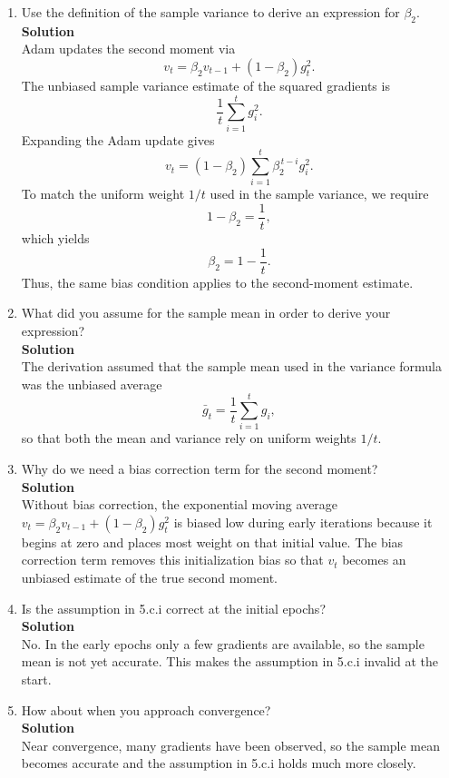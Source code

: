 \documentclass[11pt]{article}
\begin{document}
	\begin{enumerate}[label=5.c.\roman*., leftmargin=1.4cm, itemsep=0.4em]
		\item Use the definition of the sample variance to derive an expression for \(\beta_{2}\).\\
		\noindent\textbf{Solution}\\
		Adam updates the second moment via
		\[
		v_t = \beta_2 v_{t-1} + (1-\beta_2) g_t^2.
		\]
		The unbiased sample variance estimate of the squared gradients is
		\[
		\frac{1}{t}\sum_{i=1}^t g_i^2.
		\]
		Expanding the Adam update gives
		\[
		v_t = (1-\beta_2)\sum_{i=1}^t \beta_2^{\,t-i} g_i^2.
		\]
		To match the uniform weight \(1/t\) used in the sample variance, we require
		\[
		1-\beta_2 = \frac{1}{t},
		\]
		which yields
		\[
		\beta_2 = 1 - \frac{1}{t}.
		\]
		Thus, the same bias condition applies to the second-moment estimate.
		
		\item What did you assume for the sample mean in order to derive your expression?\\
		\noindent\textbf{Solution}\\
		The derivation assumed that the sample mean used in the variance formula was the
		unbiased average
		\[
		\bar{g}_t = \frac{1}{t}\sum_{i=1}^t g_i,
		\]
		so that both the mean and variance rely on uniform weights \(1/t\).
		
		\item Why do we need a bias correction term for the second moment?\\
		\noindent\textbf{Solution}\\
		Without bias correction, the exponential moving average
		\(
		v_t = \beta_2 v_{t-1} + (1-\beta_2) g_t^2
		\)
		is biased low during early iterations because it begins at zero and places most
		weight on that initial value. The bias correction term removes this initialization
		bias so that \(v_t\) becomes an unbiased estimate of the true second moment.
		
		\item Is the assumption in 5.c.i correct at the initial epochs?\\
		\noindent\textbf{Solution}\\
		No. In the early epochs only a few gradients are available, so the sample mean is
		not yet accurate. This makes the assumption in 5.c.i invalid at the start.
		
		\item How about when you approach convergence?\\
		\noindent\textbf{Solution}\\
		Near convergence, many gradients have been observed, so the sample mean becomes
		accurate and the assumption in 5.c.i holds much more closely.
		
	\end{enumerate}
	
\end{document}
